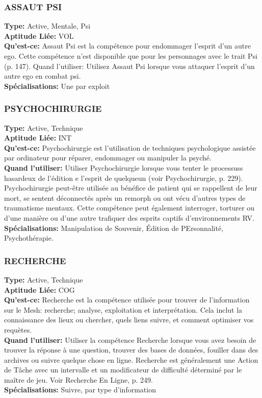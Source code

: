 \subsubsection{ASSAUT PSI} \textbf{Type:} Active, Mentale, Psi \\ \textbf{Aptitude Liée:} VOL \\ \textbf{Qu'est-ce:} Assaut Psi est la compétence pour endommager l'esprit d'un autre ego. Cette compétence n'est disponible que pour les personnages avec le trait Psi (p. 147). Quand l'utiliser: Utilisez Assaut Psi lorsque vous attaquer l'esprit d'un autre ego en combat psi. \\ \textbf{Spécialisations:} Une par exploit 

\subsubsection{PSYCHOCHIRURGIE} \textbf{Type:} Active, Technique\\ \textbf{Aptitude Liée:} INT \\ \textbf{Qu'est-ce:} Psychochirurgie est l'utilisation de techniques psychologique assistée par ordinateur pour réparer, endommager ou manipuler la psyché. \\ \textbf{Quand l'utiliser:} Utiliser Psychochirurgie lorsque vous tenter le processuss hasardeux de l'édition e l'esprit de quelqueun (voir Psychochirurgie, p. 229). Psychochirurgie peut-être utilisée au bénéfice de patient qui se rappellent de leur mort, se sentent déconnectés après un remorph ou ont vécu d'autres types de traumatisme mentaux. Cette compétence peut également interroger, torturer ou d'une manière ou d'une autre trafiquer des esprits captifs d'environnements RV. \\ \textbf{Spécialisations:} Manipulation de Souvenir, Édition de PErsonnalité, Psychothérapie. 

\subsubsection{RECHERCHE} \textbf{Type:} Active, Technique\\ \textbf{Aptitude Liée:} COG \\ \textbf{Qu'est-ce:} Recherche est la compétence utilisée pour trouver de l'information sur le Mesh: recherche; analyse, exploitation et interprétation. Cela inclut la connaissance des lieux ou chercher, quels liens suivre, et comment optimiser vos requètes. \\ \textbf{Quand l'utiliser:} Utiliser la compétence Recherche lorsque vous avez besoin de trouver la réponse à une question, trouver des bases de données, fouiller dans des archives ou suivre quelque chose en ligne. Recherche est généralement une Action de Tâche avec un intervalle et un modificateur de difficulté déterminé par le maître de jeu. Voir Recherche En Ligne, p. 249. \\ \textbf{Spécialisations:} Suivre, par type d'information 

